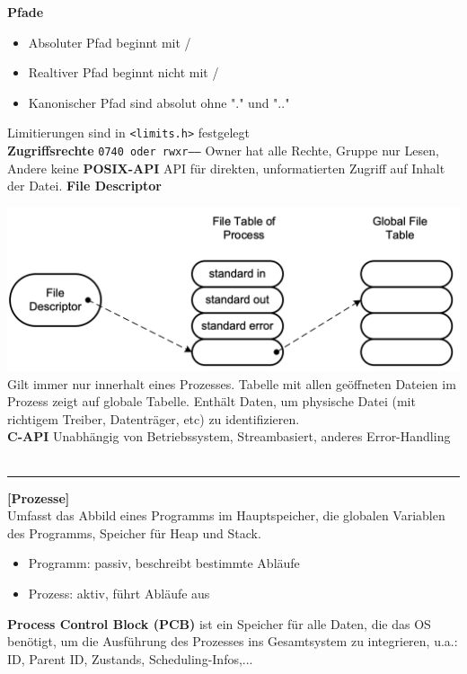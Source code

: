 \documentclass[8pt]{extarticle}
\let\oldtextbf\textbf
\renewcommand{\textbf}{\tiny\oldtextbf}
\begin{document}
\begin{multicols*}{5}
	\textbf{Pfade}
	\begin{itemize}[noitemsep, topsep=0pt, leftmargin=*]
		\item Absoluter Pfad beginnt mit /
		\item Realtiver Pfad beginnt nicht mit /
		\item Kanonischer Pfad sind absolut ohne "." und ".."
	\end{itemize}
	Limitierungen sind in \texttt{<limits.h>} festgelegt\\
	\textbf{Zugriffsrechte} \texttt{0740 oder rwxr-----} Owner hat alle Rechte, Gruppe nur Lesen, Andere keine
	\textbf{POSIX-API} API für direkten, unformatierten Zugriff auf Inhalt der Datei.
	\textbf{File Descriptor}
		
	\includegraphics[scale=0.2]{File_Descriptor.png}\\
	Gilt immer nur innerhalt eines Prozesses. Tabelle mit allen geöffneten Dateien im Prozess zeigt auf globale Tabelle. Enthält Daten, um physische Datei (mit richtigem Treiber, Datenträger, etc) zu identifizieren.\\
	\textbf{C-API} Unabhängig von Betriebssystem, Streambasiert, anderes Error-Handling\\\\
	\rule{\linewidth}{0.4pt}
	\textbf{[Prozesse]}\\
	Umfasst das Abbild eines Programms im Hauptspeicher, die globalen Variablen des Programms, Speicher für Heap und Stack. 
	\begin{itemize}[noitemsep, topsep=0pt, leftmargin=*]
		\item Programm: passiv, beschreibt bestimmte Abläufe
		\item Prozess: aktiv, führt Abläufe aus
	\end{itemize}
	\textbf{Process Control Block (PCB)} ist ein Speicher für alle Daten, die das OS benötigt, um die Ausführung des Prozesses ins Gesamtsystem zu integrieren, u.a.: ID, Parent ID, Zustands, Scheduling-Infos,...
		

\end{multicols*}
\end{document}
